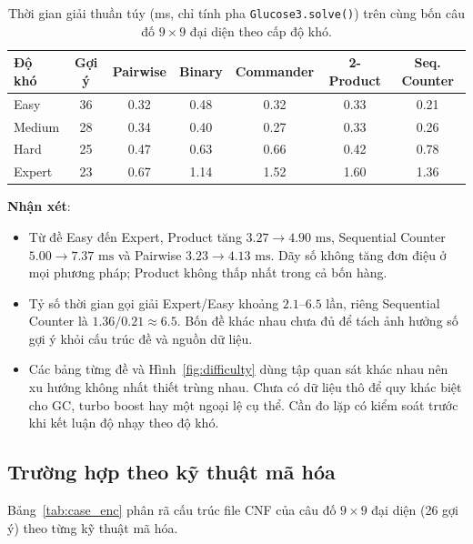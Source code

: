 \documentclass[a4paper,fleqn,nologo]{cas-sc}
\begin{document}
\begin{table}[pos=!htbp]
\centering
\small
\caption{Thời gian giải thuần túy (ms, chỉ tính pha \texttt{Glucose3.solve()}) trên cùng bốn câu đố $9\times9$ đại diện theo cấp độ khó.}
\label{tab:case_diff_solve}
\begin{tabular}{@{}l c c c c c c@{}}
\toprule
\textbf{Độ khó} & \textbf{Gợi ý} & \textbf{Pairwise} & \textbf{Binary} & \textbf{Commander} & \textbf{2-Product} & \textbf{Seq. Counter} \\
\midrule
Easy   & 36 & 0.32 & 0.48 & 0.32 & 0.33 & 0.21 \\
Medium & 28 & 0.34 & 0.40 & 0.27 & 0.33 & 0.26 \\
Hard   & 25 & 0.47 & 0.63 & 0.66 & 0.42 & 0.78 \\
Expert & 23 & 0.67 & 1.14 & 1.52 & 1.60 & 1.36 \\
\bottomrule
\end{tabular}
\end{table}

\textbf{Nhận xét}:
\begin{itemize}
    \item Từ đề Easy đến Expert, Product tăng $3.27\to4.90\text{ ms}$, Sequential Counter $5.00\to7.37\text{ ms}$ và Pairwise $3.23\to4.13\text{ ms}$. Dãy số không tăng đơn điệu ở mọi phương pháp; Product không thấp nhất trong cả bốn hàng.
    \item Tỷ số thời gian gọi giải Expert/Easy khoảng $2.1$--$6.5$ lần, riêng Sequential Counter là $1.36/0.21\approx6.5$. Bốn đề khác nhau chưa đủ để tách ảnh hưởng số gợi ý khỏi cấu trúc đề và nguồn dữ liệu.
    \item Các bảng từng đề và Hình~\ref{fig:difficulty} dùng tập quan sát khác nhau nên xu hướng không nhất thiết trùng nhau. Chưa có dữ liệu thô để quy khác biệt cho GC, turbo boost hay một ngoại lệ cụ thể. Cần đo lặp có kiểm soát trước khi kết luận độ nhạy theo độ khó.
\end{itemize}

\subsection{Trường hợp theo kỹ thuật mã hóa}
Bảng~\ref{tab:case_enc} phân rã cấu trúc file CNF của câu đố $9\times9$ đại diện (26 gợi ý) theo từng kỹ thuật mã hóa.
\end{document}
